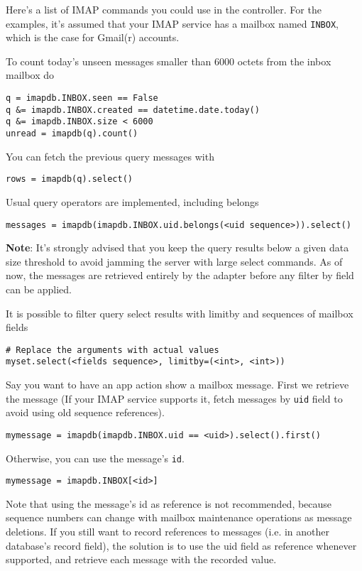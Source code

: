 \documentclass[justified,sixbynine,notoc]{tufte-book}
\def\ft{\small\tt}
\begin{document}
\begin{fullwidth}
Here's a list of IMAP commands you could use in the controller. For the examples, it's assumed that your IMAP service has a mailbox named {\ft INBOX}, which is the case for Gmail(r) accounts.

To count today's unseen messages smaller than 6000 octets from the inbox mailbox do
\begin{lstlisting}
q = imapdb.INBOX.seen == False
q &= imapdb.INBOX.created == datetime.date.today()
q &= imapdb.INBOX.size < 6000
unread = imapdb(q).count()
\end{lstlisting}

You can fetch the previous query messages with
\begin{lstlisting}
rows = imapdb(q).select()
\end{lstlisting}

Usual query operators are implemented, including belongs

\begin{lstlisting}
messages = imapdb(imapdb.INBOX.uid.belongs(<uid sequence>)).select()
\end{lstlisting}

{\bf Note}: It's strongly advised that you keep the query results below a given data size threshold to avoid jamming the server with large select commands. As of now, the messages are retrieved entirely by the adapter before any filter by field can be applied.

It is possible to filter query select results with limitby and sequences of mailbox fields
\begin{lstlisting}
# Replace the arguments with actual values
myset.select(<fields sequence>, limitby=(<int>, <int>))
\end{lstlisting}

Say you want to have an app action show a mailbox message. First we retrieve the message (If your IMAP service supports it, fetch messages by {\ft uid} field to avoid using old sequence references).

\begin{lstlisting}
mymessage = imapdb(imapdb.INBOX.uid == <uid>).select().first()
\end{lstlisting}

Otherwise, you can use the message's {\ft id}.

\begin{lstlisting}
mymessage = imapdb.INBOX[<id>]
\end{lstlisting}

Note that using the message's id as reference is not recommended, because sequence numbers can change with mailbox maintenance operations as message deletions. If you still want to record references to messages (i.e. in another database's record field), the solution is to use the uid field as reference whenever supported, and retrieve each message with the recorded value.


\end{fullwidth}
\end{document}
